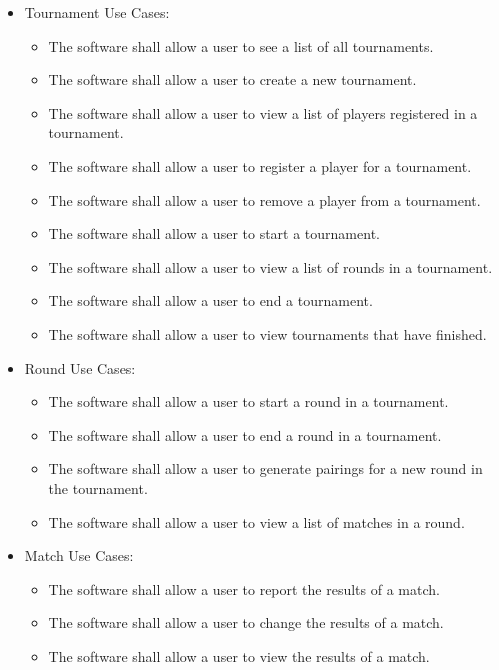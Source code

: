 \documentclass[11pt]{article}
\begin{document}
    \begin{itemize}
        \item Tournament Use Cases:
        \begin{itemize}
            \item The software shall allow a user to see a list of all tournaments.
            \item The software shall allow a user to create a new tournament.
            \item The software shall allow a user to view a list of players registered in a tournament.
            \item The software shall allow a user to register a player for a tournament.
            \item The software shall allow a user to remove a player from a tournament.
            \item The software shall allow a user to start a tournament.
            \item The software shall allow a user to view a list of rounds in a tournament.
            \item The software shall allow a user to end a tournament.
            \item The software shall allow a user to view tournaments that have finished.
        \end{itemize}


        \item Round Use Cases:
        \begin{itemize}
            \item The software shall allow a user to start a round in a tournament.
            \item The software shall allow a user to end a round in a tournament.
            \item The software shall allow a user to generate pairings for a new round in the tournament.
            \item The software shall allow a user to view a list of matches in a round.
        \end{itemize}

        \item Match Use Cases:
        \begin{itemize}
            \item The software shall allow a user to report the results of a match.
            \item The software shall allow a user to change the results of a match.
            \item The software shall allow a user to view the results of a match.
        \end{itemize}


\end{itemize}
\end{document}

